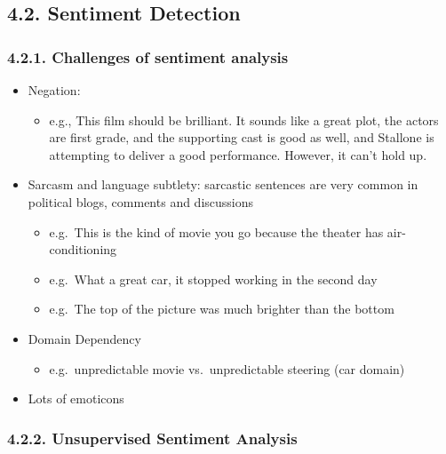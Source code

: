 \documentclass[11pt]{article}
\providecommand{\tightlist}{%
      \setlength{\itemsep}{0pt}\setlength{\parskip}{0pt}}
\begin{document}
    \hypertarget{sentiment-detection}{%
\subsection{4.2. Sentiment Detection}\label{sentiment-detection}}

    \hypertarget{challenges-of-sentiment-analysis}{%
\subsubsection{4.2.1. Challenges of sentiment
analysis}\label{challenges-of-sentiment-analysis}}

\begin{itemize}
\tightlist
\item
  Negation:

  \begin{itemize}
  \tightlist
  \item
    e.g., This film should be brilliant. It sounds like a great plot,
    the actors are first grade, and the supporting cast is good as well,
    and Stallone is attempting to deliver a good performance. However,
    it can't hold up.
  \end{itemize}
\item
  Sarcasm and language subtlety: sarcastic sentences are very common in
  political blogs, comments and discussions

  \begin{itemize}
  \tightlist
  \item
    e.g.~This is the kind of movie you go because the theater has
    air-conditioning
  \item
    e.g.~What a great car, it stopped working in the second day
  \item
    e.g.~The top of the picture was much brighter than the bottom
  \end{itemize}
\item
  Domain Dependency

  \begin{itemize}
  \tightlist
  \item
    e.g.~unpredictable movie vs.~unpredictable steering (car domain)
  \end{itemize}
\item
  Lots of emoticons
\end{itemize}

    \hypertarget{unsupervised-sentiment-analysis}{%
\subsubsection{4.2.2. Unsupervised Sentiment
Analysis}\label{unsupervised-sentiment-analysis}}
\end{document}
